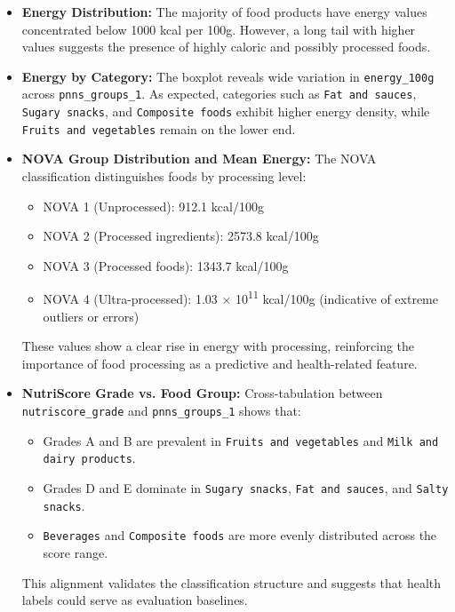 \documentclass[11pt]{article}
\begin{document}
\begin{itemize}
    \item \textbf{Energy Distribution:} The majority of food products have energy values concentrated below 1000 kcal per 100g. However, a long tail with higher values suggests the presence of highly caloric and possibly processed foods.

    \item \textbf{Energy by Category:} The boxplot reveals wide variation in \texttt{energy\_100g} across \texttt{pnns\_groups\_1}. As expected, categories such as \texttt{Fat and sauces}, \texttt{Sugary snacks}, and \texttt{Composite foods} exhibit higher energy density, while \texttt{Fruits and vegetables} remain on the lower end.

    \item \textbf{NOVA Group Distribution and Mean Energy:} The NOVA classification distinguishes foods by processing level:
    \begin{itemize}
        \item NOVA 1 (Unprocessed): 912.1 kcal/100g
        \item NOVA 2 (Processed ingredients): 2573.8 kcal/100g
        \item NOVA 3 (Processed foods): 1343.7 kcal/100g
        \item NOVA 4 (Ultra-processed): 1.03 $\times$ 10\textsuperscript{11} kcal/100g (indicative of extreme outliers or errors)
    \end{itemize}
    These values show a clear rise in energy with processing, reinforcing the importance of food processing as a predictive and health-related feature.

    \item \textbf{NutriScore Grade vs. Food Group:} Cross-tabulation between \texttt{nutriscore\_grade} and \texttt{pnns\_groups\_1} shows that:
    \begin{itemize}
        \item Grades A and B are prevalent in \texttt{Fruits and vegetables} and \texttt{Milk and dairy products}.
        \item Grades D and E dominate in \texttt{Sugary snacks}, \texttt{Fat and sauces}, and \texttt{Salty snacks}.
        \item \texttt{Beverages} and \texttt{Composite foods} are more evenly distributed across the score range.
    \end{itemize}
    This alignment validates the classification structure and suggests that health labels could serve as evaluation baselines.
\end{itemize}
\end{document}

